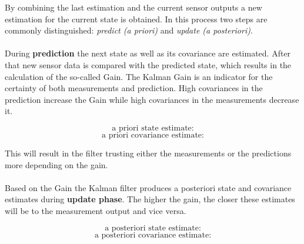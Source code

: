 By combining the last estimation and the current sensor outputs a new estimation for the current state is obtained. In this process two steps are commonly distinguished: \textit{predict (a priori)} and \textit{update (a posteriori)}.
\\\\
During \textbf{prediction} the next state as well as its covariance are estimated. After that new sensor data is compared with the predicted state, which results in the calculation of the so-called  Gain. The Kalman Gain is an indicator for the certainty of both measurements and prediction. High covariances in the prediction increase the Gain while high covariances in the measurements decrease it.

$$\text{a priori state estimate:} $$
$$\text{a priori covariance estimate:} $$

This will result in the filter trusting either the measurements or the predictions more depending on the gain. 
\\\\
Based on the Gain the Kalman filter produces a posteriori state and covariance estimates during \textbf{update phase}. The higher the gain, the closer these estimates will be to the measurement output and vice versa.

$$\text{a posteriori state estimate:} $$
$$\text{a posteriori covariance estimate:} $$